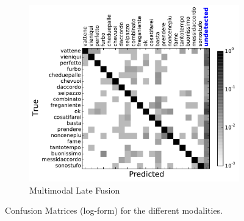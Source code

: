 \begin{figure}[t]
        ~ %
        \begin{subfigure}[c]{0.35\textwidth}
                \includegraphics[width=\textwidth]{images/cm/cm_combination}
\vspace*{-3mm}
                \caption{\small{Multimodal Late Fusion}}
                \label{fusion_cm}
        \end{subfigure}

  \caption{\small{Confusion Matrices (log-form)  for the different modalities.}}
\label{fig:confusion_matrix}
\end{figure}

